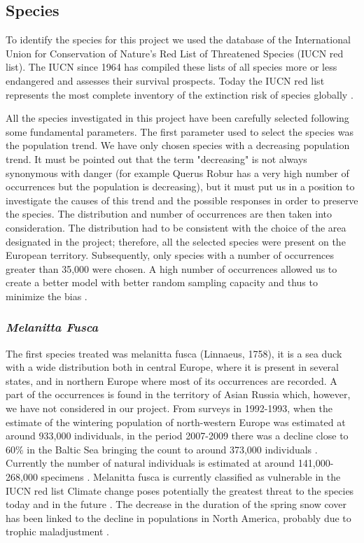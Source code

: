 \documentclass[12pt,a4paper]{article}
\begin{document}
\subsection{Species}
To identify the species for this project we used the database of the International Union for Conservation of Nature's Red List of Threatened Species (IUCN red list).
The IUCN since 1964 has compiled these lists of all species more or less endangered and assesses their survival prospects. Today the IUCN red list represents the most complete inventory of the extinction risk of species globally \citep {IUCN}.

All the species investigated in this project have been carefully selected following some fundamental parameters.
The first parameter used to select the species was the population trend. We have only chosen species with a decreasing population trend. It must be pointed out that the term "decreasing" is not always synonymous with danger (for example Querus Robur has a very high number of occurrences but the population is decreasing), but it must put us in a position to investigate the causes of this trend and the possible responses in order to preserve the species.
The distribution and number of occurrences are then taken into consideration. The distribution had to be consistent with the choice of the area designated in the project; therefore, all the selected species were present on the European territory. Subsequently, only species with a number of occurrences greater than 35,000 were chosen. A high number of occurrences allowed us to create a better model with better random sampling capacity and thus to minimize the bias \citep {kaplan} .

\subsubsection{\textit{Melanitta Fusca}} %
The first species treated was melanitta fusca (Linnaeus, 1758), it is a sea duck with a wide distribution both in central Europe, where it is present in several states, and in northern Europe where most of its occurrences are recorded.
A part of the occurrences is found in the territory of Asian Russia which, however, we have not considered in our project.
From surveys in 1992-1993, when the estimate of the wintering population of north-western Europe was estimated at around 933,000 individuals, in the period 2007-2009 there was a decline close to 60\% in the Baltic Sea bringing the count to around 373,000 individuals \citep{skov}.
Currently the number of natural individuals is estimated at around 141,000-268,000 specimens \citep{IUCN}.
Melanitta fusca is currently classified as vulnerable in the IUCN red list \citep{IUCN}
Climate change poses potentially the greatest threat to the species today and in the future \citep{IUCN}. The decrease in the duration of the spring snow cover has been linked to the decline in populations in North America, probably due to trophic maladjustment \citep{drever}.
\end{document}
